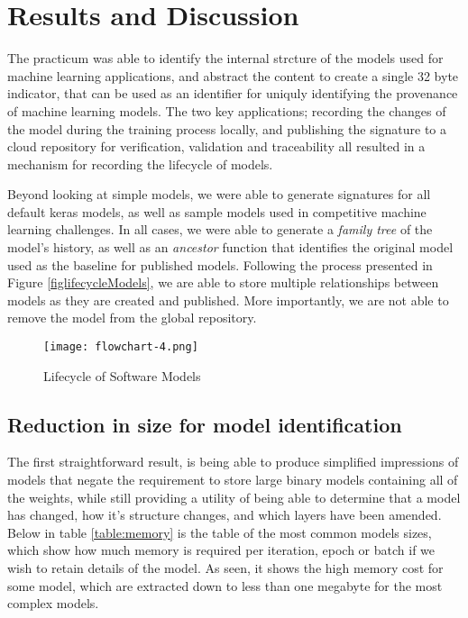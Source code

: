 \section{Results and Discussion}

The practicum was able to identify the internal strcture of the models used for machine learning applications, and abstract the content to create a single 32 byte indicator, that can be used as an identifier for  uniquly identifying the provenance of machine learning models. The two key applications; recording the changes of the model during the training process locally, and publishing the signature to a cloud repository for verification, validation and traceability all resulted in a mechanism for recording the lifecycle of models.

Beyond looking at simple models, we were able to generate signatures for all default keras models, as well as sample models used in competitive machine learning challenges. In all cases, we were able to generate a \textit{family tree} of the model's history, as well as an \textit{ancestor} function that identifies the original model used as the baseline for published models. Following the process presented in Figure \ref{figlifecycleModels}, we are able to store multiple relationships between models as they are created and published. More importantly, we are not able to remove the model from the global repository.

\begin{figure}[!t]
    \centering
    \texttt{[image: flowchart-4.png]}
    \caption{Lifecycle of Software Models}
    \label{fig:lifecycleModels}
\end{figure}

\subsection{Reduction in size for model identification}
The first straightforward result, is being able to produce simplified impressions of models that negate the requirement to store large binary models containing all of the weights, while still providing a utility of being able to determine that a model has changed, how it's structure changes, and which layers have been amended. Below in table \ref{table:memory} is the table of the most common models sizes, which show how much memory is required per iteration, epoch or batch if we wish to retain details of the model. As seen, it shows the high memory cost for some model, which are extracted down to less than one megabyte for the most complex models.

